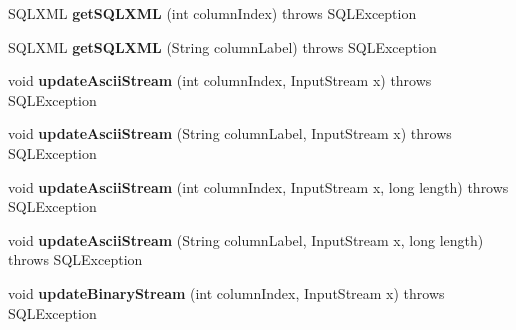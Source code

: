 \begin{DoxyCompactItemize}
S\+Q\+L\+X\+ML {\bfseries get\+S\+Q\+L\+X\+ML} (int column\+Index)  throws S\+Q\+L\+Exception 
\item 
\mbox{\label{classcom_1_1mysql_1_1cj_1_1jdbc_1_1result_1_1_result_set_impl_a2a52722c2a7bc7658383c871dad6dee5}} 
S\+Q\+L\+X\+ML {\bfseries get\+S\+Q\+L\+X\+ML} (String column\+Label)  throws S\+Q\+L\+Exception 
\item 
\mbox{\label{classcom_1_1mysql_1_1cj_1_1jdbc_1_1result_1_1_result_set_impl_acf9f583768c60872f1ca064bfd170814}} 
void {\bfseries update\+Ascii\+Stream} (int column\+Index, Input\+Stream x)  throws S\+Q\+L\+Exception 
\item 
\mbox{\label{classcom_1_1mysql_1_1cj_1_1jdbc_1_1result_1_1_result_set_impl_abd5f6b366f93c7943d95ee37762bbced}} 
void {\bfseries update\+Ascii\+Stream} (String column\+Label, Input\+Stream x)  throws S\+Q\+L\+Exception 
\item 
\mbox{\label{classcom_1_1mysql_1_1cj_1_1jdbc_1_1result_1_1_result_set_impl_a161f671650a74e14d32b7e9a482a4f5b}} 
void {\bfseries update\+Ascii\+Stream} (int column\+Index, Input\+Stream x, long length)  throws S\+Q\+L\+Exception 
\item 
\mbox{\label{classcom_1_1mysql_1_1cj_1_1jdbc_1_1result_1_1_result_set_impl_a0b4e47d93b17503c4b866f5d03f20d16}} 
void {\bfseries update\+Ascii\+Stream} (String column\+Label, Input\+Stream x, long length)  throws S\+Q\+L\+Exception 
\item 
\mbox{\label{classcom_1_1mysql_1_1cj_1_1jdbc_1_1result_1_1_result_set_impl_ac553364d96f90c4f14ec4a8f6964f78b}} 
void {\bfseries update\+Binary\+Stream} (int column\+Index, Input\+Stream x)  throws S\+Q\+L\+Exception 
\item 
\mbox{\label{classcom_1_1mysql_1_1cj_1_1jdbc_1_1result_1_1_result_set_impl_a88c925cbbaa7153961399ca0dd45cb0c}} 

\end{DoxyCompactItemize}
